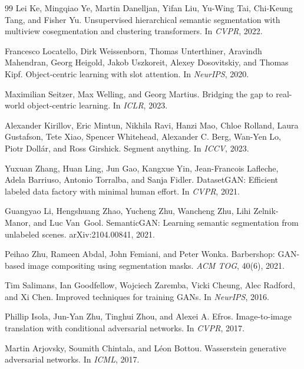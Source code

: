 \documentclass{article}
\begin{document}
\begin{thebibliography}{99}
Lei Ke, Mingqiao Ye, Martin Danelljan, Yifan Liu, Yu-Wing Tai, Chi-Keung Tang,
and Fisher Yu.
\newblock Unsupervised hierarchical semantic segmentation with multiview cosegmentation and clustering transformers.
\newblock In \emph{CVPR}, 2022.

Francesco Locatello, Dirk Weissenborn, Thomas Unterthiner, Aravindh Mahendran,
Georg Heigold, Jakob Uszkoreit, Alexey Dosovitskiy, and Thomas Kipf.
\newblock Object-centric learning with slot attention.
\newblock In \emph{NeurIPS}, 2020.

Maximilian Seitzer, Max Welling, and Georg Martius.
\newblock Bridging the gap to real-world object-centric learning.
\newblock In \emph{ICLR}, 2023.

Alexander Kirillov, Eric Mintun, Nikhila Ravi, Hanzi Mao, Chloe Rolland,
Laura Gustafson, Tete Xiao, Spencer Whitehead, Alexander C. Berg,
Wan-Yen Lo, Piotr Doll{\'a}r, and Ross Girshick.
\newblock Segment anything.
\newblock In \emph{ICCV}, 2023.

Yuxuan Zhang, Huan Ling, Jun Gao, Kangxue Yin, Jean-Francois Lafleche,
Adela Barriuso, Antonio Torralba, and Sanja Fidler.
\newblock DatasetGAN: Efficient labeled data factory with minimal human effort.
\newblock In \emph{CVPR}, 2021.

Guangyao Li, Hengshuang Zhao, Yucheng Zhu, Wancheng Zhu, Lihi Zelnik-Manor,
and Luc Van~Gool.
\newblock SemanticGAN: Learning semantic segmentation from unlabeled scenes.
\newblock arXiv:2104.00841, 2021.

Peihao Zhu, Rameen Abdal, John Femiani, and Peter Wonka.
\newblock Barbershop: GAN-based image compositing using segmentation masks.
\newblock \emph{ACM TOG}, 40(6), 2021.

Tim Salimans, Ian Goodfellow, Wojciech Zaremba, Vicki Cheung, Alec Radford,
and Xi Chen.
\newblock Improved techniques for training GANs.
\newblock In \emph{NeurIPS}, 2016.

Phillip Isola, Jun-Yan Zhu, Tinghui Zhou, and Alexei A. Efros.
\newblock Image-to-image translation with conditional adversarial networks.
\newblock In \emph{CVPR}, 2017.

Martin Arjovsky, Soumith Chintala, and L{\'e}on Bottou.
\newblock Wasserstein generative adversarial networks.
\newblock In \emph{ICML}, 2017.


\end{thebibliography}
\end{document}
